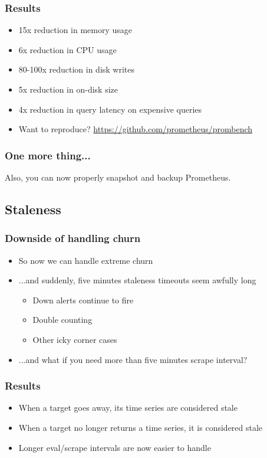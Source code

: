\documentclass[t]{beamer}
\begin{document}
\begin{frame}
	\frametitle{Results}
	\begin{itemize}
		\item 15x reduction in memory usage
		\item 6x reduction in CPU usage
		\item 80-100x reduction in disk writes
		\item 5x reduction in on-disk size
		\item 4x reduction in query latency on expensive queries
		\item Want to reproduce? \url{https://github.com/prometheus/prombench}
	\end{itemize}
\end{frame}

\begin{frame}
	\frametitle{One more thing...}
	\vfill
	Also, you can now properly snapshot and backup Prometheus.
	\vfill
\end{frame}


\subsection{Staleness}


\begin{frame}
	\frametitle{Downside of handling churn}
	\begin{itemize}
		\item So now we can handle extreme churn
		\item ...and suddenly, five minutes staleness timeouts seem awfully long
		\begin{itemize}
			\item Down alerts continue to fire
			\item Double counting
			\item Other icky corner cases
		\end{itemize}
		\item ...and what if you need more than five minutes scrape interval?
	\end{itemize}
\end{frame}

\begin{frame}
	\frametitle{Results}
	\begin{itemize}
		\item When a target goes away, its time series are considered stale
		\item When a target no longer returns a time series, it is considered stale
		\item Longer eval/scrape intervals are now easier to handle
	\end{itemize}
\end{frame}
\end{document}
